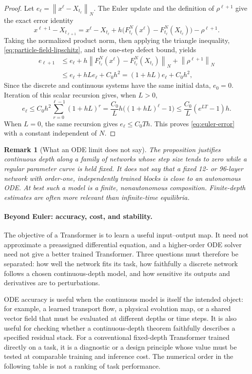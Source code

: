 \documentclass[11pt]{amsart}
\numberwithin{equation}{section}
\theoremstyle{plain}
\newtheorem{remark}[theorem]{Remark}
\newcommand{\norm}[1]{\left\lVert#1\right\rVert}
\begin{document}
\begin{proof}
Let $e_\ell=\norm{x^\ell-X_{t_\ell}}_N$.  The Euler update and the
definition of $\rho^{\ell+1}$ give the exact error identity
\[
 x^{\ell+1}-X_{t_{\ell+1}}
 =x^\ell-X_{t_\ell}
 +h\bigl(F_{t_\ell}^N(x^\ell)-F_{t_\ell}^N(X_{t_\ell})\bigr)
 -\rho^{\ell+1}.
\]
Taking the normalized product norm, then applying the triangle inequality,
\eqref{eq:particle-field-lipschitz}, and the one-step defect bound, yields
\[
\begin{split}
 e_{\ell+1}
 &\leq e_\ell
 +h\norm{F_{t_\ell}^N(x^\ell)-F_{t_\ell}^N(X_{t_\ell})}_N
 +\norm{\rho^{\ell+1}}_N\\
 &\leq e_\ell+hLe_\ell+C_0h^2
 =(1+hL)e_\ell+C_0h^2,
\end{split}
\]
Since the discrete and continuous systems have the same initial data,
$e_0=0$.
Iteration of this scalar recursion gives, when $L>0$,
\[
 e_\ell
 \leq C_0h^2\sum_{r=0}^{\ell-1}(1+hL)^r
 =\frac{C_0}{L}h\bigl((1+hL)^\ell-1\bigr)
 \leq\frac{C_0}{L}(e^{LT}-1)h.
\]
When $L=0$, the same recursion gives $e_\ell\leq C_0Th$.  This proves
\eqref{eq:euler-error} with a constant independent of $N$.
\end{proof}

\begin{remark}[What an ODE limit does not say]
The proposition justifies continuous depth along a family of networks whose
step size tends to zero while a regular parameter curve is held fixed.  It does
not say that a fixed 12- or 96-layer network with order-one, independently
trained blocks is close to an autonomous ODE.  At best such a model is a
finite, nonautonomous composition.  Finite-depth estimates are often more
relevant than infinite-time equilibria.
\end{remark}


\paragraph{\textbf{Beyond Euler: accuracy, cost, and stability.}}
The objective of a Transformer is to learn a useful input--output map.  It
need not approximate a preassigned differential equation, and a higher-order
ODE solver need not give a better trained Transformer.  Three questions must
therefore be separated: how well the network fits its task, how faithfully a
discrete network follows a chosen continuous-depth model, and how sensitive
its outputs and derivatives are to perturbations.


ODE accuracy is useful when the continuous model is itself the intended
object: for example, a learned transport flow, a physical evolution map, or
a shared vector field that must be evaluated at different depths or time
steps.  It is also useful for checking whether a continuous-depth theorem
faithfully describes a specified residual stack.  For a conventional
fixed-depth Transformer trained directly on a task, it is a diagnostic or
a design principle whose value must be tested at comparable training and
inference cost.  The numerical order in the following table is not a
ranking of task performance.
\end{document}
